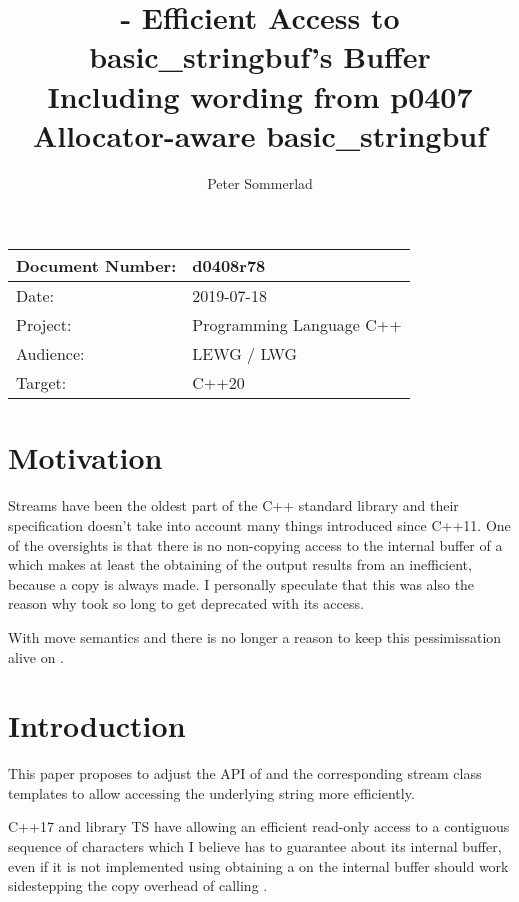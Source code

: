 \documentclass[ebook,11pt,article]{memoir}
\title{\papernumber{} - Efficient Access to basic\_stringbuf's Buffer\\
Including wording from p0407 Allocator-aware basic\_stringbuf}
\author{Peter Sommerlad}
\date{\paperdate}                        %
\newcommand{\papernumber}{d0408r78}
\newcommand{\paperdate}{2019-07-18}
\begin{document}
\maketitle
\begin{tabular}[t]{|l|l|}\hline 
Document Number: & \papernumber  \\\hline
Date: & \paperdate \\\hline
Project: & Programming Language C++\\\hline 
Audience: & LEWG / LWG\\\hline
Target: & C++20\\\hline
\end{tabular}

\chapter{Motivation}
Streams have been the oldest part of the C++ standard library and their specification doesn't take into account many things introduced since C++11. One of  the oversights is that there is no non-copying access to the internal buffer of a  which makes at least the obtaining of the output results from an  inefficient, because a copy is always made. I personally speculate that this was also the reason why  took so long to get deprecated with its  access.

With move semantics and  there is no longer a reason to keep this pessimissation alive on .


\chapter{Introduction}
This paper proposes to adjust the API of  and the corresponding stream class templates to allow accessing the underlying string more efficiently.

C++17 and library TS have  allowing an efficient read-only access to a contiguous sequence of characters which I believe  has to guarantee about its internal buffer, even if it is not implemented using  obtaining a  on the internal buffer should work sidestepping the copy overhead of calling . 
\end{document}
